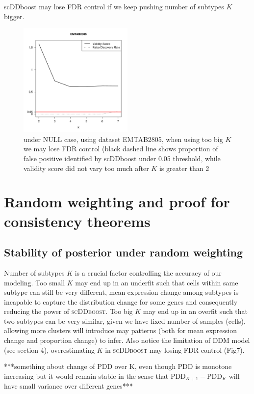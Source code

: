 \documentclass[aoas,preprint]{imsart}
\begin{document}
scDDboost may lose FDR control if we keep pushing number of subtypes $K$ bigger.
\begin{figure}[h]
\includegraphics[width = 0.5\textwidth]{Figs/breakFDR.pdf}
 \caption{under NULL case, using dataset EMTAB2805, when using too big $K$ we may lose FDR control (black dashed line shows proportion of false positive identified by scDDboost under 0.05 threshold, while validity score did not vary too much after $K$ is
 greater than 2 }
  \label{fig:7}
\end{figure}




\section{Random weighting and proof for consistency theorems}


\subsection{Stability of posterior under random weighting}

Number of subtypes $K$ is a crucial factor controlling the accuracy of our modeling. 
Too small $K$ may end up in an underfit such that cells within same subtype can still be very different,
mean expression change among subtypes is incapable to capture the distribution change for some genes and consequently reducing the power of \textsc{scDDboost}.
Too big $K$ may end up in an overfit such that two subtypes can be very similar, given we have fixed number of samples (cells), allowing more clusters will introduce may patterns (both for mean expression change and proportion change) to infer. Also notice the limitation of DDM model (see section 4), overestimating $K$ in \textsc{scDDboost} may losing FDR control (Fig7).

***something about change of PDD over K, even though PDD is monotone increasing but it would remain stable in the sense that $\text{PDD}_{K+1} - \text{PDD}_K$ will have small variance over different genes***
\end{document}
